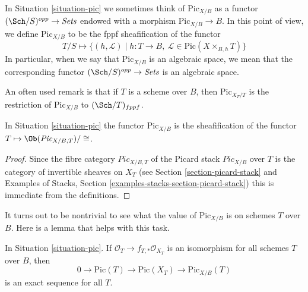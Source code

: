 \noindent
In Situation \ref{situation-pic} we sometimes think of
$\text{Pic}_{X/B}$ as a functor $(\Sch/S)^{opp} \to \textit{Sets}$
endowed with a morphism $\text{Pic}_{X/B} \to B$. In this point
of view, we define $\text{Pic}_{X/B}$ to be the fppf sheafification of
the functor
$$
T/S \longmapsto \{(h, \mathcal{L}) \mid
h : T \to B,\ \mathcal{L} \in \text{Pic}(X \times_{B, h} T)\}
$$
In particular, when we say that $\text{Pic}_{X/B}$ is an algebraic space,
we mean that the corresponding functor
$(\Sch/S)^{opp} \to \textit{Sets}$ is an algebraic space.

\medskip\noindent
An often used remark is that if $T$ is a scheme over $B$, then
$\text{Pic}_{X_T/T}$ is the restriction of $\text{Pic}_{X/B}$ to
$(\Sch/T)_{fppf}$.

\begin{lemma}
\label{lemma-pic-over-pic}
In Situation \ref{situation-pic}
the functor $\text{Pic}_{X/B}$ is the sheafification of
the functor $T \mapsto \Ob(\textit{Pic}_{X/B, T})/\cong$.
\end{lemma}

\begin{proof}
Since the fibre category $\textit{Pic}_{X/B, T}$ of the Picard stack
$\textit{Pic}_{X/B}$ over $T$ is the category of invertible sheaves on
$X_T$ (see Section \ref{section-picard-stack} and
Examples of Stacks, Section \ref{examples-stacks-section-picard-stack})
this is immediate from the definitions.
\end{proof}

\noindent
It turns out to be nontrivial to see what the value of $\text{Pic}_{X/B}$
is on schemes $T$ over $B$. Here is a lemma that helps with this task.

\begin{lemma}
\label{lemma-flat-geometrically-connected-fibres}
In Situation \ref{situation-pic}.
If $\mathcal{O}_T \to f_{T, *}\mathcal{O}_{X_T}$ is an isomorphism
for all schemes $T$ over $B$, then
$$
0 \to \text{Pic}(T) \to \text{Pic}(X_T) \to \text{Pic}_{X/B}(T)
$$
is an exact sequence for all $T$.
\end{lemma}

